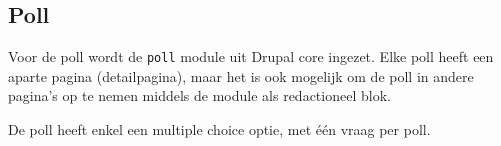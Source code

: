 \subsection{Poll}

Voor de poll wordt de \texttt{poll} module uit Drupal core ingezet.
Elke poll heeft een aparte pagina (detailpagina), maar het is ook mogelijk om de poll in andere pagina's op te nemen middels de  module als redactioneel blok.

De poll heeft enkel een multiple choice optie, met \'{e}\'{e}n vraag per poll.
